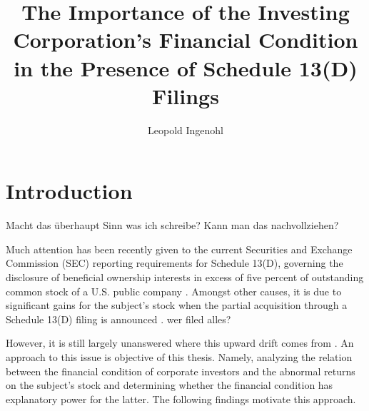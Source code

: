 \documentclass[12pt]{article}
\title{The Importance of the Investing Corporation's Financial Condition in the Presence of Schedule 13(D) Filings}
\author{Leopold Ingenohl}
\begin{document}
\maketitle

\pagebreak


\section{Introduction}

\begin{center}
	Macht das überhaupt Sinn was ich schreibe? Kann man das nachvollziehen? 
\end{center}
Much attention has been recently given to the current Securities and Exchange Commission (SEC) reporting requirements for Schedule 13(D), governing the disclosure of beneficial ownership interests in excess of five percent of outstanding common stock of a U.S. public company \citep{Giglia2018}. Amongst other causes, it is due to significant gains for the subject's stock when the partial acquisition through a Schedule 13(D) filing is announced \citep{Akhigbe2007}. wer filed alles? 



However, it is still largely unanswered where this upward drift comes from \citep{Greenwood2009}. An approach to this issue is objective of this thesis. Namely, analyzing the relation between the financial condition of corporate investors and the abnormal returns on the subject's stock and determining whether the financial condition has explanatory power for the latter. The following findings motivate this approach.  
\end{document}
